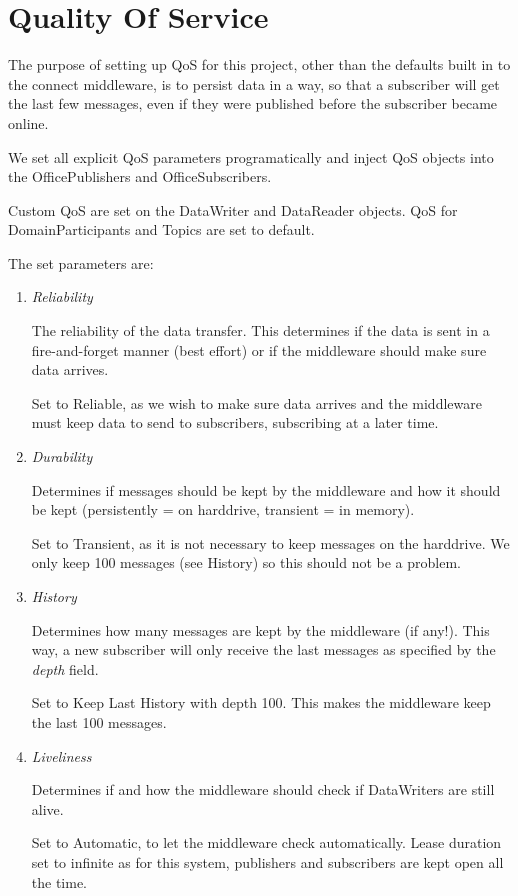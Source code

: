 \begin{center}
\end{center}

\section{Quality Of Service}
The purpose of setting up QoS for this project, other than the defaults built in to the connect middleware, is to persist data in a way, so that a subscriber will get the last few messages, even if they were published before the subscriber became online.

We set all explicit QoS parameters programatically and inject QoS objects into the OfficePublishers and OfficeSubscribers. 

Custom QoS are set on the DataWriter and DataReader objects. QoS for DomainParticipants and Topics are set to default.

The set parameters are:

\begin{enumerate}
\item \textit{Reliability}

The reliability of the data transfer. This determines if the data is sent in a fire-and-forget manner (best effort) or if the middleware should make sure data arrives.

Set to Reliable, as we wish to make sure data arrives and the middleware must keep data to send to subscribers, subscribing at a later time.

\item \textit{Durability}

Determines if messages should be kept by the middleware and how it should be kept (persistently = on harddrive, transient = in memory).

Set to Transient, as it is not necessary to keep messages on the harddrive. We only keep 100 messages (see History) so this should not be a problem.

\item \textit{History}

Determines how many messages are kept by the middleware (if any!). This way, a new subscriber will only receive the last messages as specified by the \textit{depth} field.

Set to Keep Last History with depth 100. This makes the middleware keep the last 100 messages. 

\item \textit{Liveliness}

Determines if and how the middleware should check if DataWriters are still alive. 

Set to Automatic, to let the middleware check automatically. Lease duration set to infinite as for this system, publishers and subscribers are kept open all the time.

\end{enumerate}

